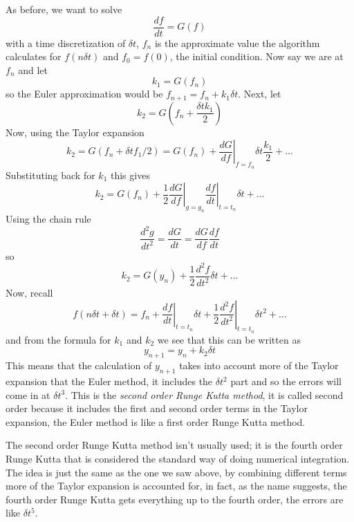 \documentclass[12pt]{article}
\begin{document}
As before, we want to solve
\begin{equation}
\frac{df}{dt}=G(f)
\end{equation}
with a time discretization of $\delta t$, $f_n$ is the approximate
value the algorithm calculates for $f(n\delta t)$ and $f_0=f(0)$, the
initial condition. Now say we are at $f_n$ and let
\begin{equation}
k_1=G(f_n)
\end{equation}
so the Euler approximation would be $f_{n+1}=f_n+k_1\delta t$. Next, let
\begin{equation}
k_2=G\left(f_n+\frac{\delta t k_1}{2}\right)
\end{equation}
Now, using the Taylor expansion
\begin{equation}
k_2=G(f_n+\delta t f_1/2)=G(f_n)+\left.\frac{dG}{df}\right|_{f=f_n}\delta t\frac{k_1}{2}+\ldots
\end{equation}
Substituting back for $k_1$ this gives
\begin{equation}
k_2=G(f_n)+\frac{1}{2}\left.\frac{dG}{df}\right|_{g=g_n}\left.\frac{df}{dt}\right|_{t=t_n}\delta t+\ldots
\end{equation}
Using the chain rule
\begin{equation}
\frac{d^2g}{dt^2}=\frac{dG}{dt}=\frac{dG}{df}\frac{df}{dt}
\end{equation}
so
\begin{equation}
k_2=G(y_n)+\frac{1}{2}\frac{d^2f}{dt^2}\delta t+\ldots
\end{equation}
Now, recall
\begin{equation}
f(n\delta t + \delta t)=f_n+\left.\frac{df}{dt}\right|_{t=t_n}\delta t+\frac{1}{2}\left.\frac{d^2f}{dt^2}\right|_{t=t_n}\delta t^2+\ldots
\end{equation}
and from the formula for $k_1$ and $k_2$ we see that this can be written as
\begin{equation}
y_{n+1}=y_n+k_2\delta t
\end{equation}
This means that the calculation of $y_{n+1}$ takes into account
more of the Taylor expansion that the Euler method, it includes the
$\delta t^2$ part and so the errors will come in at $\delta t^3$.
This is the \textsl{second order Runge Kutta method}, it is called
second order because it includes the first and second order terms in
the Taylor expansion, the Euler method is like a first order Runge
Kutta method.

The second order Runge Kutta method isn't usually used; it is the
fourth order Runge Kutta that is considered the standard way of doing
numerical integration. The idea is just the same as the one we saw
above, by combining different terms more of the Taylor expansion is
accounted for, in fact, as the name suggests, the fourth order Runge
Kutta gets everything up to the fourth order, the errors are like
$\delta t^5$.
\end{document}

